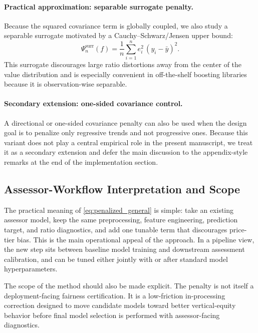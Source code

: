 \documentclass[12pt]{article}
\theoremstyle{plain}
\theoremstyle{definition}
\begin{document}
\paragraph{Practical approximation: separable surrogate penalty.}
Because the squared covariance term is globally coupled, we also study a separable surrogate motivated by a Cauchy--Schwarz/Jensen upper bound:
\begin{equation}
\label{eq:surr_penalty}
\Psi_n^{\mathrm{surr}}(f)
=
\frac{1}{n}\sum_{i=1}^n e_i^2\,(y_i-\bar y)^2.
\end{equation}
This surrogate discourages large ratio distortions away from the center of the value distribution and is especially convenient in off-the-shelf boosting libraries because it is observation-wise separable.

\paragraph{Secondary extension: one-sided covariance control.}
A directional or one-sided covariance penalty can also be used when the design goal is to penalize only regressive trends and not progressive ones. Because this variant does not play a central empirical role in the present manuscript, we treat it as a secondary extension and defer the main discussion to the appendix-style remarks at the end of the implementation section.

\subsection{Assessor-Workflow Interpretation and Scope}

The practical meaning of \eqref{eq:penalized_general} is simple: take an existing assessor model, keep the same preprocessing, feature engineering, prediction target, and ratio diagnostics, and add one tunable term that discourages price-tier bias. This is the main operational appeal of the approach. In a pipeline view, the new step sits between baseline model training and downstream assessment calibration, and can be tuned either jointly with or after standard model hyperparameters.

The scope of the method should also be made explicit. The penalty is not itself a deployment-facing fairness certification. It is a low-friction in-processing correction designed to move candidate models toward better vertical-equity behavior before final model selection is performed with assessor-facing diagnostics.
\end{document}
